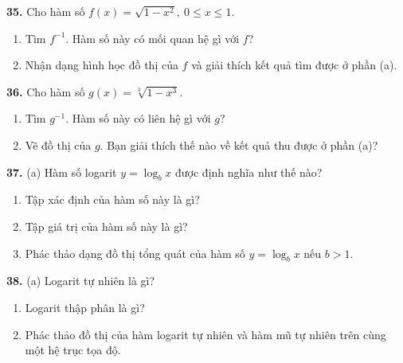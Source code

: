 \begin{minipage}[t]{0.485\textwidth}
\vspace{1.2ex}
\noindent
\textbf{35.} Cho hàm số $f(x) = \sqrt{1 - x^2},\ 0 \leqslant x \leqslant 1$.
\begin{enumerate}[label=(\alph*), leftmargin=1.5em, itemsep=0.1ex, topsep=0.3ex, parsep=0pt, partopsep=0pt]
    \item Tìm $f^{-1}$. Hàm số này có mối quan hệ gì với $f$?
    \item Nhận dạng hình học đồ thị của $f$ và giải thích kết quả tìm được ở phần (a).
\end{enumerate}

\vspace{1.2ex}
\noindent
\textbf{36.} Cho hàm số $g(x) = \sqrt[3]{1 - x^3}$.
\begin{enumerate}[label=(\alph*), leftmargin=1.5em, itemsep=0.1ex, topsep=0.3ex, parsep=0pt, partopsep=0pt]
    \item Tìm $g^{-1}$. Hàm số này có liên hệ gì với $g$?
    \item[{\color{stewartcyan}\faDesktop}\; (b)] Vẽ đồ thị của $g$. Bạn giải thích thế nào về kết quả thu được ở phần (a)?
\end{enumerate}

\vspace{1.2ex}
\noindent
\textbf{37.} (a) Hàm số logarit $y = \log_b x$ được định nghĩa như thế nào?
\begin{enumerate}[label=(\alph*), leftmargin=1.5em, itemsep=0.1ex, topsep=0.1ex, parsep=0pt, partopsep=0pt, start=2]
    \item Tập xác định của hàm số này là gì?
    \item Tập giá trị của hàm số này là gì?
    \item Phác thảo dạng đồ thị tổng quát của hàm số $y = \log_b x$ nếu $b > 1$.
\end{enumerate}

\vspace{1.2ex}
\noindent
\textbf{38.} (a) Logarit tự nhiên là gì?
\begin{enumerate}[label=(\alph*), leftmargin=1.5em, itemsep=0.1ex, topsep=0.1ex, parsep=0pt, partopsep=0pt, start=2]
    \item Logarit thập phân là gì?
    \item Phác thảo đồ thị của hàm logarit tự nhiên và hàm mũ tự nhiên trên cùng một hệ trục tọa độ.
\end{enumerate}
\end{minipage}%
\hfill
